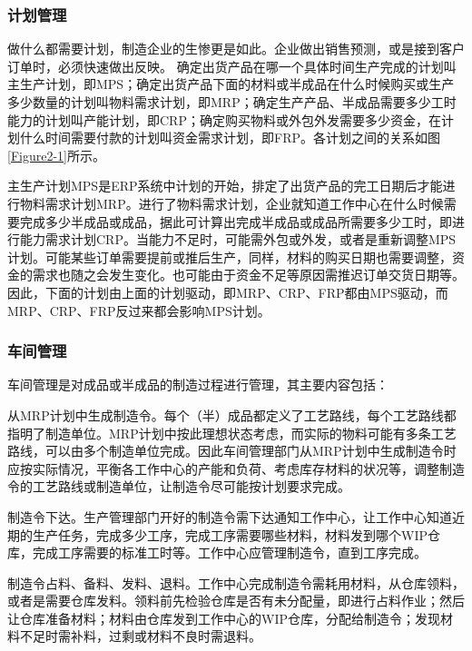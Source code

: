 \documentclass{Proposal}
\begin{document}
\subsubsection{计划管理}

做什么都需要计划，制造企业的生惨更是如此。企业做出销售预测，或是接到客户订单时，必须快速做出反映。
确定出货产品在哪一个具体时间生产完成的计划叫主生产计划，即MPS；确定出货产品下面的材料或半成品在什么时候购买或生产多少数量的计划叫物料需求计划，即MRP；确定生产产品、半成品需要多少工时能力的计划叫产能计划，即CRP；确定购买物料或外包外发需要多少资金，在计划什么时间需要付款的计划叫资金需求计划，即FRP。各计划之间的关系如图\ref{Figure2-1}所示。


主生产计划MPS是ERP系统中计划的开始，排定了出货产品的完工日期后才能进行物料需求计划MRP。进行了物料需求计划，企业就知道工作中心在什么时候需要完成多少半成品或成品，据此可计算出完成半成品或成品所需要多少工时，即进行能力需求计划CRP。当能力不足时，可能需外包或外发，或者是重新调整MPS计划。可能某些订单需要提前或推后生产，同样，材料的购买日期也需要调整，资金的需求也随之会发生变化。也可能由于资金不足等原因需推迟订单交货日期等。因此，下面的计划由上面的计划驱动，即MRP、CRP、FRP都由MPS驱动，而MRP、CRP、FRP反过来都会影响MPS计划。

\subsubsection{车间管理}

车间管理是对成品或半成品的制造过程进行管理，其主要内容包括：

从MRP计划中生成制造令。每个（半）成品都定义了工艺路线，每个工艺路线都指明了制造单位。MRP计划中按此理想状态考虑，而实际的物料可能有多条工艺路线，可以由多个制造单位完成。因此车间管理部门从MRP计划中生成制造令时应按实际情况，平衡各工作中心的产能和负荷、考虑库存材料的状况等，调整制造令的工艺路线或制造单位，让制造令尽可能按计划要求完成。

制造令下达。生产管理部门开好的制造令需下达通知工作中心，让工作中心知道近期的生产任务，完成多少工序，完成工序需要哪些材料，材料发到哪个WIP仓库，完成工序需要的标准工时等。工作中心应管理制造令，直到工序完成。

制造令占料、备料、发料、退料。工作中心完成制造令需耗用材料，从仓库领料，或者是需要仓库发料。领料前先检验仓库是否有未分配量，即进行占料作业；然后让仓库准备材料；材料由仓库发到工作中心的WIP仓库，分配给制造令；发现材料不足时需补料，过剩或材料不良时需退料。
\end{document}
